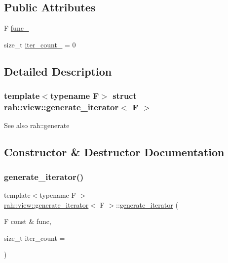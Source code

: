 \subsection*{Public Attributes}
\begin{DoxyCompactItemize}
\item 
F \mbox{\hyperlink{structrah_1_1view_1_1generate__iterator_a72f19774c5fddd0a04a293bd08dce1cd}{func\+\_\+}}
\item 
size\+\_\+t \mbox{\hyperlink{structrah_1_1view_1_1generate__iterator_a66d7843d9aefee7179023c5c13fa05c1}{iter\+\_\+count\+\_\+}} = 0
\end{DoxyCompactItemize}


\subsection{Detailed Description}
\subsubsection*{template$<$typename F$>$\newline
struct rah\+::view\+::generate\+\_\+iterator$<$ F $>$}

\begin{DoxySeeAlso}{See also}
rah\+::generate 
\end{DoxySeeAlso}


\subsection{Constructor \& Destructor Documentation}
\mbox{\label{structrah_1_1view_1_1generate__iterator_af458a280a6089691435a8ad71380fca9}} 
\subsubsection{\texorpdfstring{generate\_iterator()}{generate\_iterator()}\hspace{0.1cm}{\footnotesize\ttfamily [1/2]}}
{\footnotesize\ttfamily template$<$typename F $>$ \\
\mbox{\hyperlink{structrah_1_1view_1_1generate__iterator}{rah\+::view\+::generate\+\_\+iterator}}$<$ F $>$\+::\mbox{\hyperlink{structrah_1_1view_1_1generate__iterator}{generate\+\_\+iterator}} (\begin{DoxyParamCaption}\item[{F const \&}]{func,  }\item[{size\+\_\+t}]{iter\+\_\+count = {} }\end{DoxyParamCaption})\hspace{0.3cm}{\ttfamily [inline]}}

